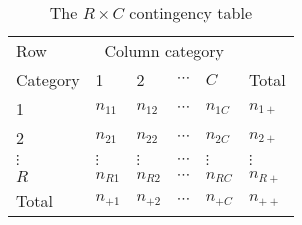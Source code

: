 \begin{table}[htb]
\caption[The R by C contingency table]{The $R \times C$ contingency table}
\label{tab:rbyc}
\vspace{1ex}
\begin{center}
\begin{tabular}{l|llll|l}
\hline
Row      & \multicolumn{4}{c|}{Column category}      &          \\
Category &   1      &   2      & $\cdots$  &  $C$    & Total    \\
\hline
   1     & $n_{11}$ & $n_{12}$ & $\cdots$ & $n_{1C}$ & $n_{1+}$ \\
   2     & $n_{21}$ & $n_{22}$ & $\cdots$ & $n_{2C}$ & $n_{2+}$ \\
$\vdots$ & $\vdots$ & $\vdots$ & $\cdots$ & $\vdots$ & $\vdots$ \\
   $R$   & $n_{R1}$ & $n_{R2}$ & $\cdots$ & $n_{RC}$ & $n_{R+}$   \\  
\hline
Total    & $n_{+1}$ & $n_{+2}$ & $\cdots$ & $n_{+C}$ & $n_{++}$   \\
\hline
\end{tabular}
\end{center}
\end{table}